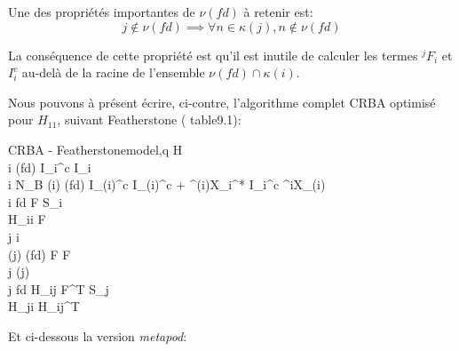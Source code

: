 \documentclass{report}
\begin{document}
\setlength{\columnseprule}{0.5pt}
\begin{multicols}{2}\raggedcolumns
\begin{flushleft}
Une des propriétés importantes de $\nu(fd)$ à retenir est:
\begin{equation*}
j \notin \nu(fd) \implies \forall n \in \kappa(j), n \notin \nu(fd)
\end{equation*}

La conséquence de cette propriété est qu'il est inutile de calculer les termes $^jF_i$ et $I_i^c$ au-delà de la racine de l'ensemble $\nu(fd) \cap \kappa(i)$.
\end{flushleft}

Nous pouvons à présent écrire, ci-contre, l'algorithme complet CRBA optimisé pour $H_{11}$, suivant Featherstone (\cite{bib_featherstone} table9.1):\\

    	\begin{spacing}{1.5}
		\begin{pseudocode}{CRBA - Featherstone}{model,q} \label{algo_crbaFeatherstoneH11}
    H  \\
		\FOREACH i \in \nu(fd) \DO
		  I_i^c \GETS I_i \\
		\FOR i \GETS N_B  \DO
		\BEGIN
		  \IF \lambda(i) \in \nu(fd)
		  \THEN
		    I_{\lambda(i)}^c \GETS I_{\lambda(i)}^c + {^{\lambda(i)}X_i^*} \: {I_i^c} \: {^iX_{\lambda(i)}} \\
		  \IF i \in fd \THEN
		  \BEGIN
			  F  \: S_i \\
			  H_{ii}  F \\
			  j \GETS i \\
			  \WHILE \lambda(j) \in \nu(fd) \DO
			  \BEGIN
			    F  F \\
			    j \GETS \lambda(j) \\
			    \IF j \in fd \THEN
			    \BEGIN
				    H_{ij} \GETS F^T S_j \\
				    H_{ji} \GETS H_{ij}^T
			    \END
			  \END
			\END
		\END
	  \end{pseudocode}
	  \end{spacing}

\end{multicols}


Et ci-dessous la version \emph{metapod}:\\
\end{document}
